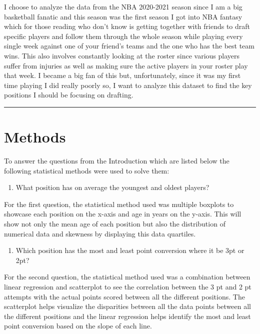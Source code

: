 \documentclass[
]{article}
\providecommand{\tightlist}{%
  \setlength{\itemsep}{0pt}\setlength{\parskip}{0pt}}
\begin{document}
I choose to analyze the data from the NBA 2020-2021 season since I am a
big basketball fanatic and this season was the first season I got into
NBA fantasy which for those reading who don't know is getting together
with friends to draft specific players and follow them through the whole
season while playing every single week against one of your friend's
teams and the one who has the best team wins. This also involves
constantly looking at the roster since various players suffer from
injuries as well as making sure the active players in your roster play
that week. I became a big fan of this but, unfortunately, since it was
my first time playing I did really poorly so, I want to analyze this
dataset to find the key positions I should be focusing on drafting.

\vspace{.2in}

\hrule
\vspace{.2in}

\hypertarget{methods}{%
\section{Methods}\label{methods}}

To answer the questions from the Introduction which are listed below the
following statistical methods were used to solve them:

\begin{enumerate}
\def\labelenumi{\arabic{enumi}.}
\tightlist
\item
  What position has on average the youngest and oldest players?
\end{enumerate}

For the first question, the statistical method used was multiple
boxplots to showcase each position on the x-axis and age in years on the
y-axis. This will show not only the mean age of each position but also
the distribution of numerical data and skewness by displaying this data
quartiles.

\begin{enumerate}
\def\labelenumi{\arabic{enumi}.}
\setcounter{enumi}{1}
\tightlist
\item
  Which position has the most and least point conversion where it be 3pt
  or 2pt?
\end{enumerate}

For the second question, the statistical method used was a combination
between linear regression and scatterplot to see the correlation between
the 3 pt and 2 pt attempts with the actual points scored between all the
different positions. The scatterplot helps visualize the disparities
between all the data points between all the different positions and the
linear regression helps identify the most and least point conversion
based on the slope of each line.
\end{document}
